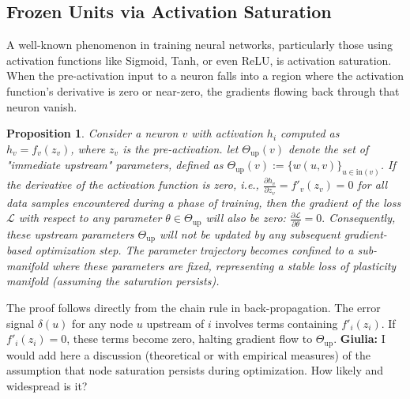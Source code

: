 \documentclass{article}
\newcommand{\Loss}{\mathcal{L}}
\newcommand{\giulia}[1]{{\color{ForestGreen}\textbf{Giulia:} #1}}
\newtheorem{proposition}{Proposition}[section]
\begin{document}
\subsection{Frozen Units via Activation Saturation}

A well-known phenomenon in training neural networks, particularly those using activation functions like Sigmoid, Tanh, or even ReLU, is activation saturation. When the pre-activation input to a neuron falls into a region where the activation function's derivative is zero or near-zero, the gradients flowing back through that neuron vanish. 

\begin{proposition}
\label{prop:saturated}
Consider a neuron $v$ with activation $h_i$ computed as $h_v = f_v(z_v)$, where $z_v$ is the pre-activation. let $\Theta_{\text{up}}(v)$ denote the set of "immediate upstream" parameters, defined as ${\Theta_{\text{up}}(v):=\{w(u,v)\}_{u\in \text{in}(v)}}$. If the derivative of the activation function is zero, i.e.,
\(
\frac{\partial h_v}{\partial z_v} = f'_v(z_v) = 0
\)
for all data samples encountered during a phase of training, then the gradient of the loss $\Loss$ with respect to any parameter $\theta \in \Theta_{\text{up}}$ will also be zero:
\(
\frac{\partial\Loss}{\partial\theta} = 0.
\)
Consequently, these upstream parameters $\Theta_{\text{up}}$ will not be updated by any subsequent gradient-based optimization step.  The parameter trajectory becomes confined to a sub-manifold where these parameters are fixed, representing a stable loss of plasticity manifold (assuming the saturation persists).
\end{proposition}

The proof follows directly from the chain rule in back-propagation. The error signal $\delta(u)$ for any node $u$ upstream of $i$ involves terms containing $f'_i(z_i)$. If $f'_i(z_i)=0$, these terms become zero, halting gradient flow to $\Theta_{\text{up}}$. \giulia{I would add here a discussion (theoretical or with empirical measures) of the assumption that node saturation persists during optimization. How likely and widespread is it?}
\end{document}

